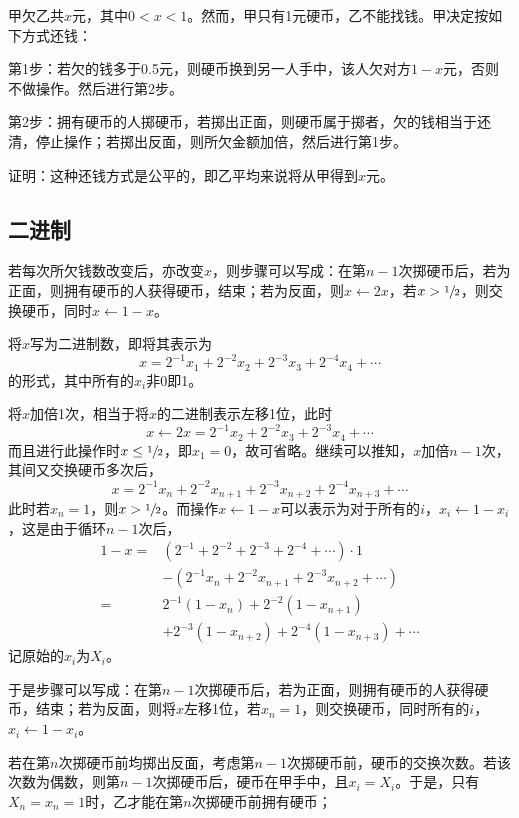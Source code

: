 

甲欠乙共$x$元，其中$0 < x < 1$。然而，甲只有1元硬币，乙不能找钱。甲决定按如下方式还钱：

第1步：若欠的钱多于0.5元，则硬币换到另一人手中，该人欠对方$1 - x$元，否则不做操作。然后进行第2步。

第2步：拥有硬币的人掷硬币，若掷出正面，则硬币属于掷者，欠的钱相当于还清，停止操作；若掷出反面，则所欠金额加倍，然后进行第1步。

证明：这种还钱方式是公平的，即乙平均来说将从甲得到$x$元。

\subsection{二进制}

若每次所欠钱数改变后，亦改变$x$，则步骤可以写成：在第$n - 1$次掷硬币后，若为正面，则拥有硬币的人获得硬币，结束；若为反面，则$x \leftarrow 2x$，若$x > \sfrac12$，则交换硬币，同时$x \leftarrow 1 - x$。

将$x$写为二进制数，即将其表示为
\[ x = 2^{-1}x_1 + 2^{-2}x_2 + 2^{-3}x_3 + 2^{-4}x_4 + \cdots \]
的形式，其中所有的$x_i$非0即1。

将$x$加倍1次，相当于将$x$的二进制表示左移1位，此时
\[ x \leftarrow 2x = 2^{-1}x_2 + 2^{-2}x_3 + 2^{-3}x_4 + \cdots \]
而且进行此操作时$x \le \sfrac12$，即$x_1 = 0$，故可省略。继续可以推知，$x$加倍$n - 1$次，其间又交换硬币多次后，
\[ x = 2^{-1}x_n + 2^{-2}x_{n + 1} + 2^{-3}x_{n + 2} + 2^{-4}x_{n + 3} + \cdots \]
此时若$x_n = 1$，则$x > \sfrac12$。而操作$x \leftarrow 1 - x$可以表示为对于所有的$i$，$x_i \leftarrow 1 - x_i$，这是由于循环$n - 1$次后，
\begin{align*}
  1 - x ={}& \left(2^{-1} + 2^{-2} + 2^{-3} + 2^{-4} + \cdots\right)\cdot1 \\
  &- \left(2^{-1}x_n + 2^{-2}x_{n + 1} + 2^{-3}x_{n + 2} + \cdots\right) \\
  ={}& 2^{-1}(1 - x_n) + 2^{-2}(1 - x_{n + 1}) \\
  &+ 2^{-3}(1 - x_{n + 2})+ 2^{-4}(1 - x_{n + 3}) + \cdots
\end{align*}
记原始的$x_i$为$X_i$。

于是步骤可以写成：在第$n - 1$次掷硬币后，若为正面，则拥有硬币的人获得硬币，结束；若为反面，则将$x$左移1位，若$x_n = 1$，则交换硬币，同时所有的$i$，$x_i \leftarrow 1 - x_i$。

若在第$n$次掷硬币前均掷出反面，考虑第$n - 1$次掷硬币前，硬币的交换次数。若该次数为偶数，则第$n - 1$次掷硬币后，硬币在甲手中，且$x_i = X_i$。于是，只有$X_n = x_n = 1$时，乙才能在第$n$次掷硬币前拥有硬币；

